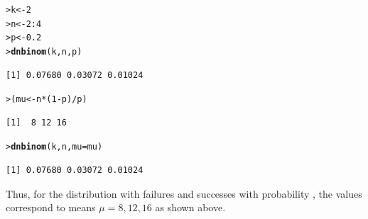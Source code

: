\documentclass[10pt,krantz2]{krantz}\usepackage[]{graphicx}\usepackage[]{color}
\makeatletter
\newcommand{\hlnum}[1]{\textcolor[rgb]{0.686,0.059,0.569}{#1}}%
\newcommand{\hlopt}[1]{\textcolor[rgb]{0,0,0}{#1}}%
\newcommand{\hlstd}[1]{\textcolor[rgb]{0.345,0.345,0.345}{#1}}%
\newcommand{\hlkwb}[1]{\textcolor[rgb]{0.69,0.353,0.396}{#1}}%
\newcommand{\hlkwc}[1]{\textcolor[rgb]{0.333,0.667,0.333}{#1}}%
\newcommand{\hlkwd}[1]{\textcolor[rgb]{0.737,0.353,0.396}{\textbf{#1}}}%
\newenvironment{kframe}{%
 \def\at@end@of@kframe{}%
 \ifinner\ifhmode%
  \def\at@end@of@kframe{\end{minipage}}%
  \begin{minipage}{\columnwidth}%
 \fi\fi%
 \def\FrameCommand##1{\hskip\@totalleftmargin \hskip-\fboxsep
 \colorbox{shadecolor}{##1}\hskip-\fboxsep
     \hskip-\linewidth \hskip-\@totalleftmargin \hskip\columnwidth}%
 \MakeFramed {\advance\hsize-\width
   \@totalleftmargin\z@ \linewidth\hsize
   \@setminipage}}%
 {\par\unskip\endMakeFramed%
 \at@end@of@kframe}
\newenvironment{knitrout}{}{} %
\renewenvironment{knitrout}{\small\renewcommand{\baselinestretch}{.85}}{} %
\makeatother
\begin{document}
\begin{knitrout}
\color{fgcolor}\begin{kframe}
\begin{alltt}
\hlstd{> }\hlstd{k} \hlkwb{<-} \hlnum{2}
\hlstd{> }\hlstd{n} \hlkwb{<-} \hlnum{2} \hlopt{:} \hlnum{4}
\hlstd{> }\hlstd{p} \hlkwb{<-} \hlnum{0.2}
\hlstd{> }\hlkwd{dnbinom}\hlstd{(k, n, p)}
\end{alltt}
\begin{verbatim}
[1] 0.07680 0.03072 0.01024
\end{verbatim}
\begin{alltt}
\hlstd{> }\hlstd{(mu} \hlkwb{<-} \hlstd{n} \hlopt{*} \hlstd{(}\hlnum{1} \hlopt{-} \hlstd{p)} \hlopt{/} \hlstd{p)}
\end{alltt}
\begin{verbatim}
[1]  8 12 16
\end{verbatim}
\begin{alltt}
\hlstd{> }\hlkwd{dnbinom}\hlstd{(k, n,} \hlkwc{mu} \hlstd{= mu)}
\end{alltt}
\begin{verbatim}
[1] 0.07680 0.03072 0.01024
\end{verbatim}
\end{kframe}
\end{knitrout}
Thus, for the distribution with  failures and
  successes with probability ,
the values  correspond to means $\mu= 8, 12, 16$
as shown above.
\end{document}
